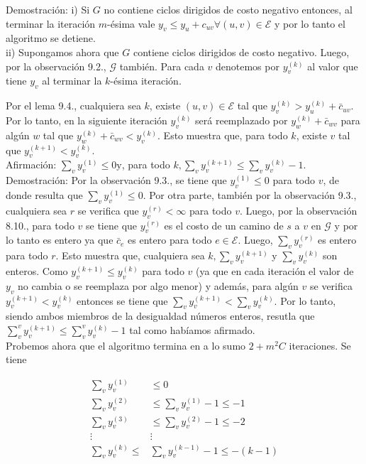 \documentclass[10pt]{article}
\begin{document}
Demostración: i) Si $G$ no contiene ciclos dirigidos de costo negativo entonces, al terminar la iteración $m$-ésima vale $y_{v} \leq y_{u}+c_{u v} \forall(u, v) \in \mathcal{E}$ y por lo tanto el algoritmo se detiene.\\
ii) Supongamos ahora que $G$ contiene ciclos dirigidos de costo negativo. Luego, por la observación 9.2., $\mathcal{G}$ también. Para cada $v$ denotemos por $y_{v}^{(k)}$ al valor que tiene $y_{v}$ al terminar la $k$-ésima iteración.

Por el lema 9.4., cualquiera sea $k$, existe $(u, v) \in \mathcal{E}$ tal que $y_{v}^{(k)}>y_{u}^{(k)}+\bar{c}_{u v}$. Por lo tanto, en la siguiente iteración $y_{v}^{(k)}$ será reemplazado por $y_{w}^{(k)}+\bar{c}_{w v}$ para algún $w$ tal que $y_{w}^{(k)}+\bar{c}_{w v}<y_{v}^{(k)}$. Esto muestra que, para todo $k$, existe $v$ tal que $y_{v}^{(k+1)}<y_{v}^{(k)}$.\\
Afirmación: $\sum_{v} y_{v}^{(1)} \leq 0 \mathrm{y}$, para todo $k, \sum_{v} y_{v}^{(k+1)} \leq \sum_{v} y_{v}^{(k)}-1$.\\
Demostración: Por la observación 9.3., se tiene que $y_{v}^{(1)} \leq 0$ para todo $v$, de donde resulta que $\sum_{v} y_{v}^{(1)} \leq 0$. Por otra parte, también por la observación 9.3., cualquiera sea $r$ se verifica que $y_{v}^{(r)}<\infty$ para todo $v$. Luego, por la observación 8.10., para todo $v$ se tiene que $y_{v}^{(r)}$ es el costo de un camino de $s$ a $v$ en $\mathcal{G}$ y por lo tanto es entero ya que $\bar{c}_{e}$ es entero para todo $e \in \mathcal{E}$. Luego, $\sum_{v} y_{v}^{(r)}$ es entero para todo $r$. Esto muestra que, cualquiera sea $k, \sum_{v} y_{v}^{(k+1)}$ y $\sum_{v} y_{v}^{(k)}$ son enteros. Como $y_{v}^{(k+1)} \leq y_{v}^{(k)}$ para todo $v$ (ya que en cada iteración el valor de $y_{v}$ no cambia o se reemplaza por algo menor) y además, para algún $v$ se verifica $y_{v}^{(k+1)}<y_{v}^{(k)}$ entonces se tiene que $\sum_{v} y_{v}^{(k+1)}<\sum_{v} y_{v}^{(k)}$. Por lo tanto, siendo ambos miembros de la desigualdad números enteros, resutla que $\sum_{v}^{v} y_{v}^{(k+1)} \leq \sum_{v}^{v} y_{v}^{(k)}-1$ tal como habíamos afirmado.\\
Probemos ahora que el algoritmo termina en a lo sumo $2+m^{2} C$ iteraciones. Se tiene

$$
\begin{aligned}
\sum_{v} y_{v}^{(1)} & \leq 0 \\
\sum_{v} y_{v}^{(2)} & \leq \sum_{v} y_{v}^{(1)}-1 \leq-1 \\
\sum_{v} y_{v}^{(3)} & \leq \sum_{v} y_{v}^{(2)}-1 \leq-2 \\
\vdots & \vdots \\
\sum_{v} y_{v}^{(k)} \leq & \sum_{v} y_{v}^{(k-1)}-1 \leq-(k-1)
\end{aligned}
$$
\end{document}
